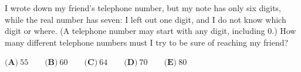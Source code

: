 I wrote down my friend's telephone number, but my note has only six digits, while the real number has seven: I left out one digit, and I do not know which digit or where. (A telephone number may start with any digit, including $0$.) How many different telephone numbers must I try to be sure of reaching my friend?

$\textbf{(A)}\ 55\qquad\textbf{(B)}\ 60\qquad\textbf{(C)}\ 64\qquad\textbf{(D)}\ 70\qquad\textbf{(E)}\ 80$
